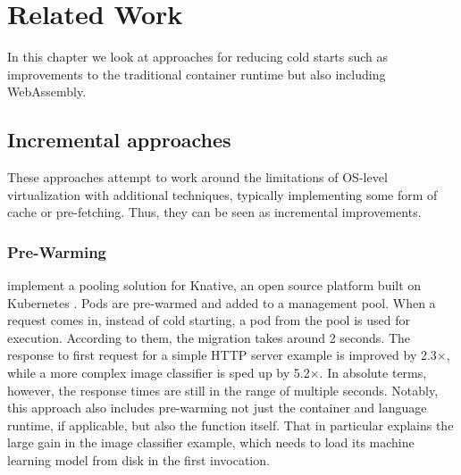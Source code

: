 \chapter{Related Work}
\label{chapter:relatedwork}

In this chapter we look at approaches for reducing cold starts such as improvements to the traditional container runtime but also including WebAssembly.

\section{Incremental approaches}

These approaches attempt to work around the limitations of OS-level virtualization with additional techniques, typically implementing some form of cache or pre-fetching. Thus, they can be seen as incremental improvements.

\subsection{Pre-Warming}

\citeauthor{Lin2019} implement a pooling solution for Knative, an open source platform built on Kubernetes \cite{Lin2019}. Pods are pre-warmed and added to a management pool. When a request comes in, instead of cold starting, a pod from the pool is used for execution. According to them, the migration takes around 2 seconds. The response to first request for a simple HTTP server example is improved by 2.3$\times$, while a more complex image classifier is sped up by 5.2$\times$. In absolute terms, however, the response times are still in the range of multiple seconds. Notably, this approach also includes pre-warming not just the container and language runtime, if applicable, but also the function itself. That in particular explains the large gain in the image classifier example, which needs to load its machine learning model from disk in the first invocation.

